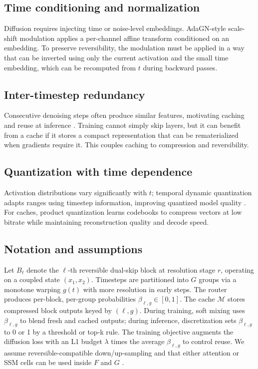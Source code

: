 \documentclass{article}
\begin{document}
\subsection{Time conditioning and normalization}
Diffusion requires injecting time or noise-level embeddings. AdaGN-style scale-shift modulation applies a per-channel affine transform conditioned on an embedding. To preserve reversibility, the modulation must be applied in a way that can be inverted using only the current activation and the small time embedding, which can be recomputed from $t$ during backward passes.

\subsection{Inter-timestep redundancy}
Consecutive denoising steps often produce similar features, motivating caching and reuse at inference \cite{ma_2024_learning}. Training cannot simply skip layers, but it can benefit from a cache if it stores a compact representation that can be rematerialized when gradients require it. This couples caching to compression and reversibility.

\subsection{Quantization with time dependence}
Activation distributions vary significantly with $t$; temporal dynamic quantization adapts ranges using timestep information, improving quantized model quality \cite{so_2023_temporal}. For caches, product quantization learns codebooks to compress vectors at low bitrate while maintaining reconstruction quality and decode speed.

\subsection{Notation and assumptions}
Let $B_{\ell}$ denote the $\ell$-th reversible dual-skip block at resolution stage $r$, operating on a coupled state $(x_1, x_2)$. Timesteps are partitioned into $G$ groups via a monotone warping $g(t)$ with more resolution in early steps. The router produces per-block, per-group probabilities $\beta_{\ell,g} \in [0,1]$. The cache $\mathcal{M}$ stores compressed block outputs keyed by $(\ell, g)$. During training, soft mixing uses $\beta_{\ell,g}$ to blend fresh and cached outputs; during inference, discretization sets $\beta_{\ell,g}$ to 0 or 1 by a threshold or top-k rule. The training objective augments the diffusion loss with an L1 budget $\lambda$ times the average $\beta_{\ell,g}$ to control reuse. We assume reversible-compatible down/up-sampling and that either attention or SSM cells can be used inside $F$ and $G$ \cite{yan_2023_diffusion}.
\end{document}
